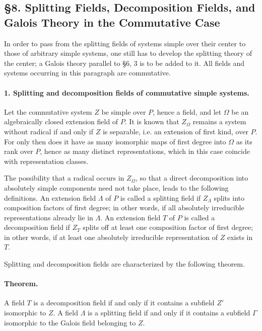 \documentclass[11pt]{article}
\begin{document}
\subsection*{§8. Splitting Fields, Decomposition Fields, and Galois Theory in the Commutative Case}

In order to pass from the splitting fields of systems simple over their center to those of arbitrary simple systems, one still has to develop the splitting theory of the center; a Galois theory parallel to §6, 3 is to be added to it. All fields and systems occurring in this paragraph are commutative.

\paragraph{1. Splitting and decomposition fields of commutative simple systems.}
Let the commutative system \(Z\) be simple over \(P\), hence a field, and let \(\Omega\) be an algebraically closed extension field of \(P\). It is known that \(Z_\Omega\) remains a system without radical if and only if \(Z\) is separable, i.e. an extension of first kind, over \(P\). For only then does it have as many isomorphic maps of first degree into \(\Omega\) as its rank over \(P\), hence as many distinct representations, which in this case coincide with representation classes.

The possibility that a radical occurs in \(Z_\Omega\), so that a direct decomposition into absolutely simple components need not take place, leads to the following definitions. An extension field \(\Lambda\) of \(P\) is called a splitting field if \(Z_\Lambda\) splits into composition factors of first degree; in other words, if all absolutely irreducible representations already lie in \(\Lambda\). An extension field \(T\) of \(P\) is called a decomposition field if \(Z_T\) splits off at least one composition factor of first degree; in other words, if at least one absolutely irreducible representation of \(Z\) exists in \(T\).

Splitting and decomposition fields are characterized by the following theorem.

\paragraph{Theorem.}
A field \(T\) is a decomposition field if and only if it contains a subfield \(Z'\) isomorphic to \(Z\). A field \(\Lambda\) is a splitting field if and only if it contains a subfield \(\Gamma\) isomorphic to the Galois field belonging to \(Z\).
\end{document}
